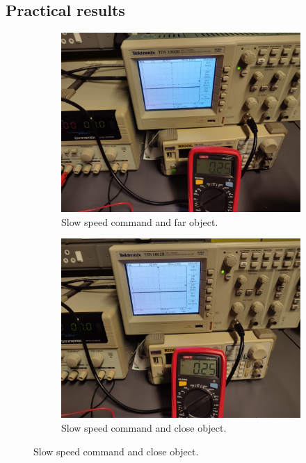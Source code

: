 \clearpage
\subsection{Practical results}
\begin{figure}[H]
\centering
\begin{subfigure}[]{0.4\textwidth}
\includegraphics[width=\linewidth]{./Figures/CurSens_Left_sf.jpeg}
\caption{Slow speed command and far object.}
\label{subfig:mtrctrl_left_prac_sf}	
\end{subfigure}
\hfill
\begin{subfigure}[]{0.4\textwidth}
\includegraphics[width=\linewidth]{./Figures/CurSens_Left_sc.jpeg}
\caption{Slow speed command and close object.} 			

\end{subfigure}
\end{figure}
